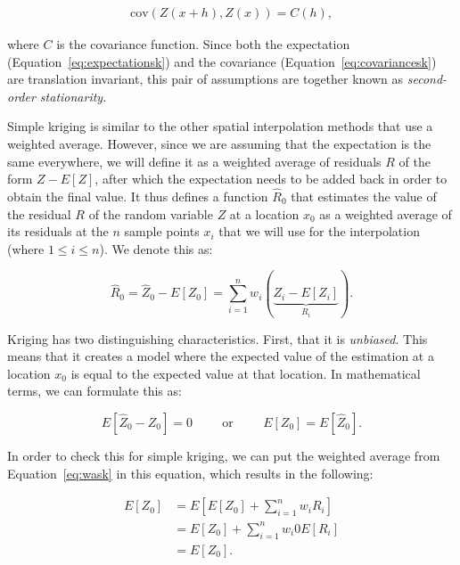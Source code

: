\begin{align}
\label{eq:covariancesk}
\mathrm{cov}\left(Z(x+h), Z(x)\right) = C(h),
\end{align}

where \(C\) is the covariance function.
Since both the expectation (Equation~\ref{eq:expectationsk}) and the covariance (Equation~\ref{eq:covariancesk}) are translation invariant, this pair of assumptions are together known as \emph{second-order stationarity}.

Simple kriging is similar to the other spatial interpolation methods that use a weighted average.
However, since we are assuming that the expectation is the same everywhere, we will define it as a weighted average of residuals \(R\) of the form \(Z-E[Z]\), after which the expectation needs to be added back in order to obtain the final value.
It thus defines a function \(\hat{R}_0\) that estimates the value of the residual \(R\) of the random variable \(Z\) at a location \(x_0\) as a weighted average of its residuals at the \(n\) sample points \(x_i\) that we will use for the interpolation (where \(1 \leq i \leq n\)).
We denote this as:

\begin{equation}
\label{eq:wask}
\hat{R}_0 = \hat{Z}_0 - E[Z_0] = \sum_{i=1}^n w_i (\underbrace{Z_i-E[Z_i]}_{R_i}).
\end{equation}

Kriging has two distinguishing characteristics.
First, that it is \emph{unbiased}.
This means that it creates a model where the expected value of the estimation at a location \(x_0\) is equal to the expected value at that location.
In mathematical terms, we can formulate this as:

\begin{equation}
\label{eq:unbiased}
E\left[ \hat{Z}_0 - Z_0 \right] = 0 \hspace{1cm}\text{or}\hspace{1cm}E\left[Z_0\right] = E\left[ \hat{Z}_0 \right].
\end{equation}

In order to check this for simple kriging, we can put the weighted average from Equation~\ref{eq:wask} in this equation, which results in the following:

\begin{align}
  E\left[ Z_0 \right] &= E\left[ E[Z_0] + \sum_{i=1}^n w_i R_i \right] \nonumber \\
  &= E[Z_0] + \sum_{i=1}^n w_i 0{E[R_i]} \nonumber \\
  &= E[Z_0].  \nonumber
\end{align}

